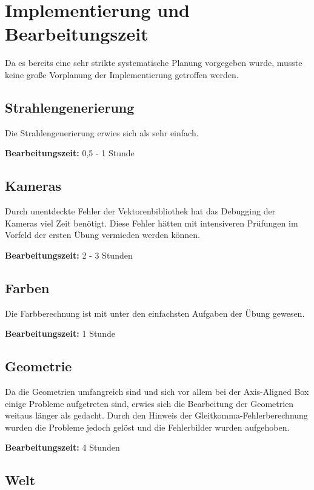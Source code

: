 \documentclass[tog]{acmsiggraph}
\begin{document}
\section{Implementierung und Bearbeitungszeit}

Da es bereits eine sehr strikte systematische Planung vorgegeben wurde, musste keine große Vorplanung der Implementierung getroffen werden.

\subsection{Strahlengenerierung}

Die Strahlengenerierung erwies sich als sehr einfach.

\textbf{Bearbeitungszeit:} 0,5 - 1 Stunde

\subsection{Kameras}

Durch unentdeckte Fehler der Vektorenbibliothek hat das Debugging der Kameras viel Zeit benötigt. Diese Fehler hätten mit intensiveren Prüfungen im Vorfeld der ersten Übung vermieden werden können.

\textbf{Bearbeitungszeit:} 2 - 3 Stunden

\subsection{Farben}

Die Farbberechnung ist mit unter den einfachsten Aufgaben der Übung gewesen.

\textbf{Bearbeitungszeit:} 1 Stunde

\subsection{Geometrie}

Da die Geometrien umfangreich sind und sich vor allem bei der Axis-Aligned Box einige Probleme aufgetreten sind, erwies sich die Bearbeitung der Geometrien weitaus länger als gedacht. Durch den Hinweis der Gleitkomma-Fehlerberechnung wurden die Probleme jedoch gelöst und die Fehlerbilder wurden aufgehoben.

\textbf{Bearbeitungszeit:} 4 Stunden

\subsection{Welt}
\end{document}
